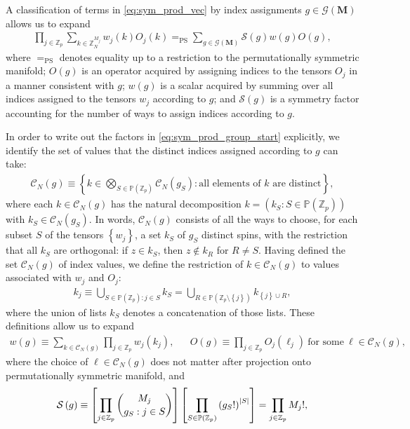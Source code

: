 \documentclass[nofootinbib,notitlepage,11pt]{revtex4-2}
\renewcommand{\t}{\text} %
\newcommand{\p}[1]{\left(#1\right)} %
\renewcommand{\sp}[1]{\left[#1\right]} %
\renewcommand{\set}[1]{\left\{#1\right\}} %
\newcommand{\m}{\bm} %
\newcommand{\1}{\mathds{1}}
\newcommand{\C}{\mathcal{C}}
\newcommand{\G}{\mathcal{G}}
\renewcommand{\S}{\mathcal{S}}
\newcommand{\PP}{\mathbb{P}}
\newcommand{\ZZ}{\mathbb{Z}}
\newcommand{\EQPS}{=_{\text{PS}}}
\begin{document}
A classification of terms in \eqref{eq:sym_prod_vec} by index
assignments $g\in\G\p{\m M}$ allows us to expand
\begin{align}
  \prod_{j\in\ZZ_p} \sum_{k\in\ZZ_N^{M_j}} w_j\p{k} O_j\p{k}
  \EQPS \sum_{g\in\G\p{\m M}} \S\p{g} w\p{g} O\p{g},
  \label{eq:sym_prod_group_start}
\end{align}
where $\EQPS$ denotes equality up to a restriction to the
permutationally symmetric manifold; $O\p{g}$ is an operator acquired
by assigning indices to the tensors $O_j$ in a manner consistent with
$g$; $w\p{g}$ is a scalar acquired by summing over all indices
assigned to the tensors $w_j$ according to $g$; and $\S\p{g}$ is a
symmetry factor accounting for the number of ways to assign indices
according to $g$.

In order to write out the factors in \eqref{eq:sym_prod_group_start}
explicitly, we identify the set of values that the distinct indices
assigned according to $g$ can take:
\begin{align}
  \C_N\p{g}
  \equiv \set{ k \in \bigotimes_{S\in\PP\p{\ZZ_p}} \C_N\p{g_S}
    : \t{all elements of $k$ are distinct} },
  \label{eq:index_values}
\end{align}
where each $k\in\C_N\p{g}$ has the natural decomposition
$k=\p{k_S:S\in\PP\p{\ZZ_p}}$ with $k_S\in\C_N\p{g_S}$.  In words,
$\C_N\p{g}$ consists of all the ways to choose, for each subset $S$ of
the tensors $\set{w_j}$, a set $k_S$ of $g_S$ distinct spins, with the
restriction that all $k_S$ are orthogonal: if $z\in k_S$, then
$z\notin k_R$ for $R\ne S$.  Having defined the set $\C_N\p{g}$ of
index values, we define the restriction of $k\in\C_N\p{g}$ to values
associated with $w_j$ and $O_j$:
\begin{align}
  k_j \equiv \bigcup_{S\in\PP\p{\ZZ_p} : j\in S} k_S
  = \bigcup_{R\in\PP\p{\ZZ_p\setminus\set{j}}} k_{\set{j}\cup R},
\end{align}
where the union of lists $k_S$ denotes a concatenation of those lists.
These definitions allow us to expand
\begin{align}
  w\p{g} \equiv \sum_{k\in\C_N\p{g}} \prod_{j\in\ZZ_p} w_j\p{k_j},
  &&
  O\p{g} \equiv \prod_{j\in\ZZ_p}
  O_j\p{\ell_j}~\t{for some}~\ell\in\C_N\p{g},
  \label{eq:diagram_factors}
\end{align}
where the choice of $\ell\in\C_N\p{g}$ does not matter after
projection onto permutationally symmetric manifold, and
\begin{align}
  \S\p{g} \equiv \sp{\prod_{j\in\ZZ_p} { M_j \choose g_S : j\in S }}
  \sp{\prod_{S\in\PP\p{\ZZ_p}} \p{g_S!}^\abs{S}}
  = \prod_{j\in\ZZ_p} M_j!,
  \label{eq:sym_prod_symmetry}
\end{align}
\end{document}
